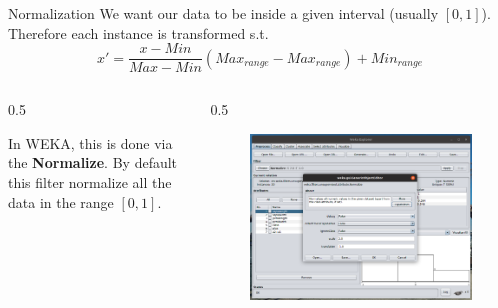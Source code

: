 \documentclass{beamer}
\newcommand{\cols}[4]{
	\begin{columns}[t]
	\begin{column}{#1\textwidth}
		#3
	\end{column}
	\begin{column}{#2\textwidth}
		#4
	\end{column}
	\end{columns}
	
}
\begin{document}
\begin{frame}{Normalization}
We want our data to be inside a given interval (usually $[0,1]$). 
Therefore each instance is transformed s.t.
\[
	x' = \frac{x-Min}{Max-Min}(Max_{range}-Max_{range})+Min _{range}
\]
\cols{0.5}{0.5}{

In WEKA, this is done via the \textbf{Normalize}.
By default this filter normalize all the data in the range
$[0,1]$. 

}
{
\begin{figure}[t]
\includegraphics[scale=0.12]{img/normalize.png}
\end{figure}
}
\end{frame}
\end{document}
